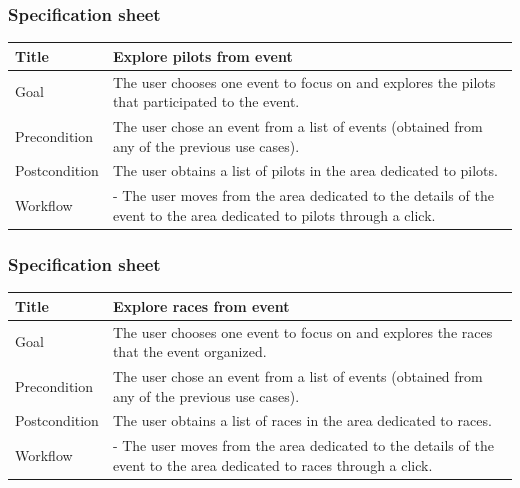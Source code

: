 \documentclass{beamer}
\begin{document}
\begin{frame}
    \frametitle{Specification sheet}
    \begin{table}
        \tiny
        \begin{tabular}{|p{2cm}|p{6cm}|}
        \hline  
        Title & \textbf{Explore pilots from event} \\
        \hline
        Goal & The user chooses one event to focus on and explores the pilots that participated to the event. \\
        \hline
        Precondition & The user chose an event from a list of events (obtained from any of the previous use cases).\\
        \hline
        Postcondition & The user obtains a list of pilots in the area dedicated to pilots. \\
        \hline
        Workflow &
        - The user moves from the area dedicated to the details of the event to the
        area dedicated to pilots through a click. \\
        \hline
        \end{tabular}
\end{table}
\end{frame}

\begin{frame}
    \frametitle{Specification sheet}
    \begin{table}
        \tiny
        \begin{tabular}{|p{2cm}|p{6cm}|}
        \hline  
        Title & \textbf{Explore races from event} \\
        \hline
        Goal & The user chooses one event to focus on and
        explores the races that the event organized. \\
        \hline
        Precondition & The user chose an event from a list of events (obtained from any of the previous use cases).\\
        \hline
        Postcondition & The user obtains
        a list of races in the area dedicated to races. \\
        \hline
        Workflow &
        - The user moves from the area dedicated to the details of the event to the
        area dedicated to races through a click. \\
        \hline
        \end{tabular}
\end{table}
\end{frame}
\end{document}
